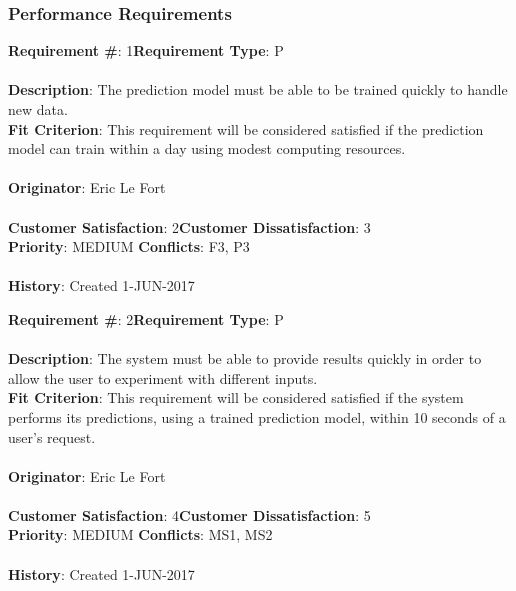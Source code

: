 \documentclass[titlepage]{article}
\begin{document}
\subsubsection{Performance Requirements}
\begin{framed}
	\noindent\textbf{Requirement \#}: 1\hfill \textbf{Requirement Type}: P\hfill\\\\
	\noindent\textbf{Description}: The prediction model must be able to be trained quickly to handle new data.\\
	\textbf{Fit Criterion}: This requirement will be considered satisfied if the prediction model can train within a day using modest computing resources.\\\\
	\textbf{Originator}: Eric Le Fort\\\\
	\noindent\textbf{Customer Satisfaction}: 2\hfill \textbf{Customer Dissatisfaction}: 3\hfill\\
	\textbf{Priority}: MEDIUM \hfill \textbf{Conflicts}: F3, P3\hfill\\\\
	\noindent\textbf{History}: Created 1-JUN-2017
\end{framed}
\begin{framed}
	\noindent\textbf{Requirement \#}: 2\hfill \textbf{Requirement Type}: P\hfill\\\\
	\noindent\textbf{Description}: The system must be able to provide results quickly in order to allow the user to experiment with different inputs.\\
	\textbf{Fit Criterion}: This requirement will be considered satisfied if the system performs its predictions, using a trained prediction model, within 10 seconds of a user's request.\\\\
	\textbf{Originator}: Eric Le Fort\\\\
	\noindent\textbf{Customer Satisfaction}: 4\hfill \textbf{Customer Dissatisfaction}: 5\hfill\\
	\textbf{Priority}: MEDIUM \hfill \textbf{Conflicts}: MS1, MS2\hfill\\\\ 
	\noindent\textbf{History}: Created 1-JUN-2017
\end{framed}
\newpage
\end{document}
